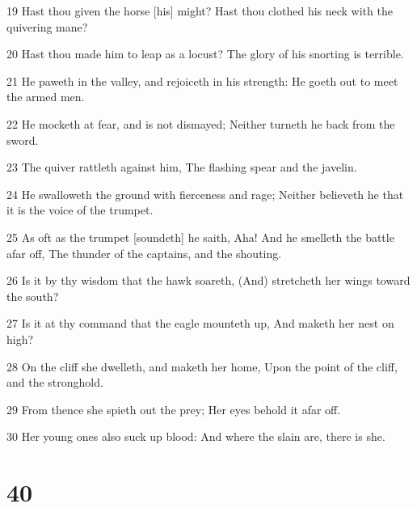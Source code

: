 \par 19 Hast thou given the horse [his] might? Hast thou clothed his neck with the quivering mane?
\par 20 Hast thou made him to leap as a locust? The glory of his snorting is terrible.
\par 21 He paweth in the valley, and rejoiceth in his strength: He goeth out to meet the armed men.
\par 22 He mocketh at fear, and is not dismayed; Neither turneth he back from the sword.
\par 23 The quiver rattleth against him, The flashing spear and the javelin.
\par 24 He swalloweth the ground with fierceness and rage; Neither believeth he that it is the voice of the trumpet.
\par 25 As oft as the trumpet [soundeth] he saith, Aha! And he smelleth the battle afar off, The thunder of the captains, and the shouting.
\par 26 Is it by thy wisdom that the hawk soareth, (And) stretcheth her wings toward the south?
\par 27 Is it at thy command that the eagle mounteth up, And maketh her nest on high?
\par 28 On the cliff she dwelleth, and maketh her home, Upon the point of the cliff, and the stronghold.
\par 29 From thence she spieth out the prey; Her eyes behold it afar off.
\par 30 Her young ones also suck up blood: And where the slain are, there is she.

\chapter{40}

